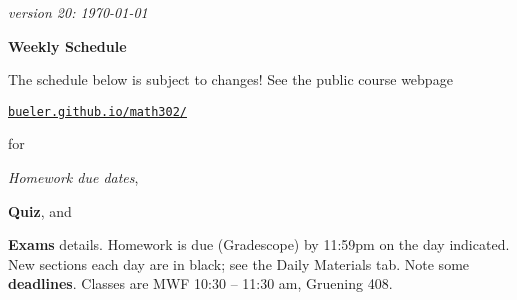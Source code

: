 \documentclass[12pt]{article}
\newcommand{\due}[1]{\strut {\color{BrickRed} \textsl{#1}}}
\newcommand{\ee}[1]{\strut {\color{Blue} \textbf{#1}}}
\newcommand{\dlinline}[1]{{\color{Purple} \textbf{#1}}}
\newcommand{\dl}[1]{{\small \dlinline{#1}}}
\begin{document}
\hfill \small \emph{version 20: \today} \normalsize

\bigskip\bigskip
\centerline{\Large \textbf{Weekly Schedule}}

\bigskip
The schedule below is subject to changes!  See the public course webpage

\medskip

\centerline{\href{https://bueler.github.io/math302/index.html}{\texttt{bueler.github.io/math302/}}}

\noindent for \due{Homework due dates}, \ee{Quiz}, and \ee{Exams} details.  Homework is due (Gradescope) by 11:59pm on the day indicated.  New sections each day are in black; see the Daily Materials tab.  Note some \dl{deadlines}.  Classes are MWF 10:30 -- 11:30 am, Gruening 408.

\bigskip
\end{document}
